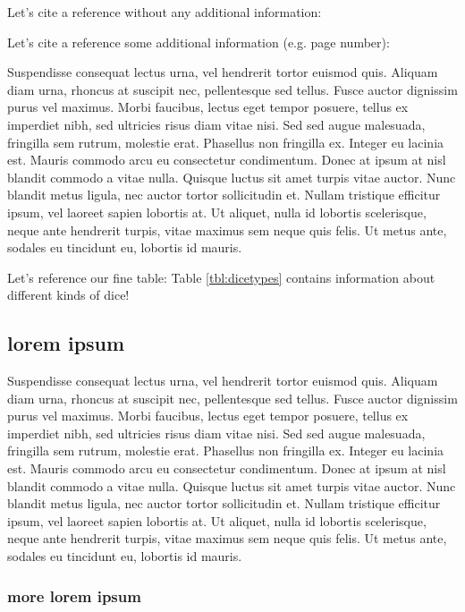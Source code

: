 \documentclass[english]{jamk-report}
\begin{document}
Let's cite a reference without any additional information: 

Let's cite a reference some additional information (e.g. page number):

Suspendisse consequat lectus urna, vel hendrerit tortor euismod quis. Aliquam
diam urna, rhoncus at suscipit nec, pellentesque sed tellus. Fusce auctor
dignissim purus vel maximus. Morbi faucibus, lectus eget tempor posuere, tellus
ex imperdiet nibh, sed ultricies risus diam vitae nisi. Sed sed augue
malesuada, fringilla sem rutrum, molestie erat.  Phasellus non fringilla ex.
Integer eu lacinia est. Mauris commodo arcu eu consectetur condimentum. Donec
at ipsum at nisl blandit commodo a vitae nulla.  Quisque luctus sit amet turpis
vitae auctor. Nunc blandit metus ligula, nec auctor tortor sollicitudin et.
Nullam tristique efficitur ipsum, vel laoreet sapien lobortis at. Ut aliquet,
nulla id lobortis scelerisque, neque ante hendrerit turpis, vitae maximus sem
neque quis felis. Ut metus ante, sodales eu tincidunt eu, lobortis id mauris.

Let's reference our fine table: Table \ref{tbl:dicetypes} contains information
about different kinds of dice!~\cite{einstein}


\subsection{lorem ipsum}

Suspendisse consequat lectus urna, vel hendrerit tortor euismod quis. Aliquam
diam urna, rhoncus at suscipit nec, pellentesque sed tellus. Fusce auctor
dignissim purus vel maximus. Morbi faucibus, lectus eget tempor posuere, tellus
ex imperdiet nibh, sed ultricies risus diam vitae nisi. Sed sed augue
malesuada, fringilla sem rutrum, molestie erat.  Phasellus non fringilla ex.
Integer eu lacinia est. Mauris commodo arcu eu consectetur condimentum. Donec
at ipsum at nisl blandit commodo a vitae nulla.  Quisque luctus sit amet turpis
vitae auctor. Nunc blandit metus ligula, nec auctor tortor sollicitudin et.
Nullam tristique efficitur ipsum, vel laoreet sapien lobortis at. Ut aliquet,
nulla id lobortis scelerisque, neque ante hendrerit turpis, vitae maximus sem
neque quis felis. Ut metus ante, sodales eu tincidunt eu, lobortis id mauris.

\subsubsection{more lorem ipsum}
\end{document}

